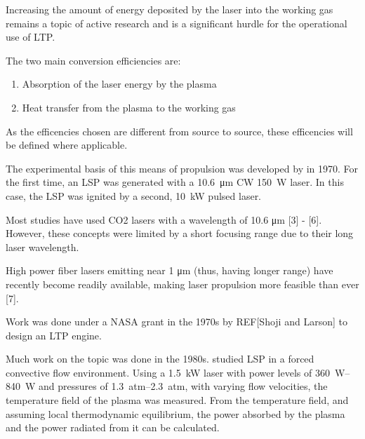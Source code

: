 
    Increasing the amount of energy deposited by the laser into the working gas remains a topic of active research and is a significant hurdle for the operational use of LTP.


        The two main conversion efficiencies are:
        \begin{enumerate}
            \item Absorption of the laser energy by the plasma
            \item Heat transfer from the plasma to the working gas
        \end{enumerate}

    As the efficencies chosen are different from source to source, these efficencies will be defined where applicable.
    

    The experimental basis of this means of propulsion was developed by \textcite{generalovContinuousOpticalDischarge1970} in 1970. For the first time, an LSP was generated with a \qty{10.6}{μm} CW  \qty{150}{W} laser. In this case, the LSP was ignited by a second, \qty{10}{kW} pulsed  laser.
    
    Most studies have used CO2 lasers with a wavelength of 10.6 μm [3] - [6]. However, these concepts were limited by a short focusing range due to their long laser wavelength. 
    
    High power fiber lasers emitting near 1 μm (thus, having longer range) have recently become readily available, making laser propulsion more feasible than ever [7].

    

        Work was done under a NASA grant in the 1970s by REF[Shoji and Larson] to design an LTP engine. 


        
        

        Much work on the topic was done in the 1980s. \textcite{keeferPowerAbsorptionLasersustained1986a} studied LSP in a forced convective flow environment. Using a \qty{1.5}{kW}  laser with power levels of \qtyrange{360}{840}{W} and pressures of \qtyrange{1.3}{2.3}{atm}, with varying flow velocities, the temperature field of the plasma was measured. From the temperature field, and assuming local thermodynamic equilibrium, the power absorbed by the plasma and the power radiated from it can be calculated.

